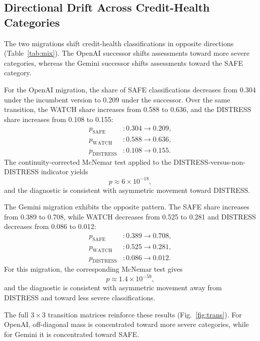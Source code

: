 \documentclass{ieeeaccess}
\begin{document}
\subsection{Directional Drift Across Credit-Health Categories}
The two migrations shift credit-health classifications in opposite directions (Table~\ref{tab:mix}). The OpenAI successor shifts assessments toward more severe categories, whereas the Gemini successor shifts assessments toward the SAFE category.

For the OpenAI migration, the share of SAFE classifications decreases from 0.304 under the incumbent version to 0.209 under the successor. Over the same transition, the WATCH share increases from 0.588 to 0.636, and the DISTRESS share increases from 0.108 to 0.155:
\begin{equation}
\begin{aligned}
p_{\mathrm{SAFE}} &: 0.304 \rightarrow 0.209,\\
p_{\mathrm{WATCH}} &: 0.588 \rightarrow 0.636,\\
p_{\mathrm{DISTRESS}} &: 0.108 \rightarrow 0.155.
\end{aligned}
\end{equation}
The continuity-corrected McNemar test applied to the DISTRESS-versus-non-DISTRESS indicator yields
\begin{equation}
p \approx 6\times10^{-18},
\end{equation}
and the diagnostic is consistent with asymmetric movement toward DISTRESS.

The Gemini migration exhibits the opposite pattern. The SAFE share increases from 0.389 to 0.708, while WATCH decreases from 0.525 to 0.281 and DISTRESS decreases from 0.086 to 0.012:
\begin{equation}
\begin{aligned}
p_{\mathrm{SAFE}} &: 0.389 \rightarrow 0.708,\\
p_{\mathrm{WATCH}} &: 0.525 \rightarrow 0.281,\\
p_{\mathrm{DISTRESS}} &: 0.086 \rightarrow 0.012.
\end{aligned}
\end{equation}
For this migration, the corresponding McNemar test gives
\begin{equation}
p \approx 1.4\times10^{-59},
\end{equation}
and the diagnostic is consistent with asymmetric movement away from DISTRESS and toward less severe classifications.

The full $3\times3$ transition matrices reinforce these results (Fig.~\ref{fig:trans}). For OpenAI, off-diagonal mass is concentrated toward more severe categories, while for Gemini it is concentrated toward SAFE.
\end{document}
